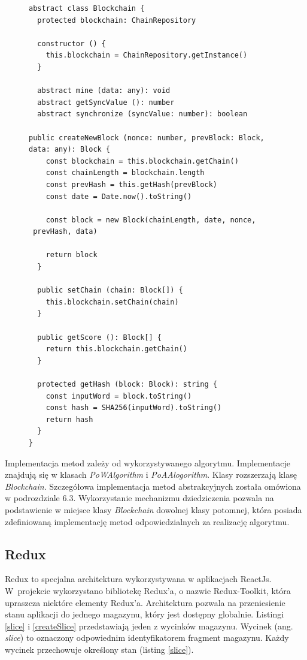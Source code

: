 \documentclass[a4paper,12pt]{book}
\begin{document}
\newpage
\begin{figure}  
  \centering
\begin{lstlisting}[style=ES6, caption={Klasa \textit{Blockchain}.}, label={abstractBlockchain}]
abstract class Blockchain {
  protected blockchain: ChainRepository

  constructor () {
    this.blockchain = ChainRepository.getInstance()
  }

  abstract mine (data: any): void
  abstract getSyncValue (): number
  abstract synchronize (syncValue: number): boolean

public createNewBlock (nonce: number, prevBlock: Block, 
data: any): Block {
    const blockchain = this.blockchain.getChain()
    const chainLength = blockchain.length
    const prevHash = this.getHash(prevBlock)
    const date = Date.now().toString()

    const block = new Block(chainLength, date, nonce,
 prevHash, data)

    return block
  }

  public setChain (chain: Block[]) {
    this.blockchain.setChain(chain)
  }

  public getScore (): Block[] {
    return this.blockchain.getChain()
  }

  protected getHash (block: Block): string {
    const inputWord = block.toString()
    const hash = SHA256(inputWord).toString()
    return hash
  }
}
\end{lstlisting}
\end{figure}
Implementacja metod zależy od wykorzystywanego algorytmu. Implementacje znajdują się w klasach \textit{PoWAlgorithm} i \textit{PoAAlogorithm}. Klasy rozszerzają klasę \textit{Blockchain}.
Szczegółowa implementacja metod abstrakcyjnych została omówiona w podrozdziale 6.3. Wykorzystanie mechanizmu dziedziczenia pozwala na podstawienie w miejsce klasy \textit{Blockchain} dowolnej klasy potomnej, która posiada zdefiniowaną implementację metod odpowiedzialnych za realizację algorytmu.
 
\subsection{Redux}

Redux to specjalna architektura wykorzystywana w aplikacjach ReactJs. W~projekcie wykorzystano bibliotekę Redux'a, o nazwie Redux-Toolkit, która upraszcza niektóre elementy Redux'a. Architektura pozwala na przeniesienie stanu aplikacji do jednego magazynu, który jest dostępny globalnie. Listingi \ref{slice} i  \ref{createSlice} przedstawiają jeden z wycinków magazynu. Wycinek (ang. \textit{slice}) to oznaczony odpowiednim identyfikatorem fragment magazynu. Każdy wycinek przechowuje określony stan (listing \ref{slice}).
\end{document}
